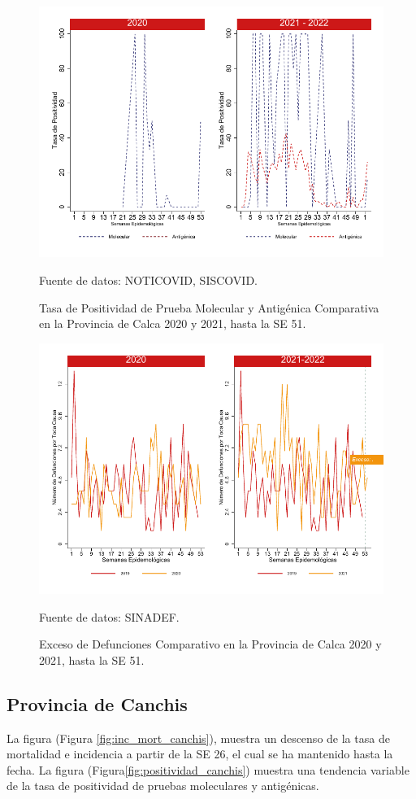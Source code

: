 \documentclass[12pt,a4paper,openany]{book}
\begin{document}
		\begin{figure}[h]
			\caption{Tasa de Positividad de Prueba Molecular y Antigénica Comparativa en la Provincia de Calca 2020 y 2021, hasta la SE 51.}\label{fig:positividad_calca}
			\begin{center}
				\includegraphics[width=0.7\linewidth]{../figuras/positividad_20_21_4}
			\end{center}
			{\footnotesize {Fuente de datos: NOTICOVID, SISCOVID.}}
		\end{figure}
		
		\begin{figure}[h]
			\caption{Exceso de Defunciones Comparativo en la Provincia de Calca 2020 y 2021, hasta la SE 51.}\label{fig:exceso_calca}
			\begin{center}
				\includegraphics[width=0.7\linewidth]{../figuras/exceso_4}
			\end{center}
			{\footnotesize {Fuente de datos: SINADEF.}}
		\end{figure}
		
		\clearpage
		
		\subsection*{Provincia de Canchis}
		\noindent La figura (Figura \ref{fig:inc_mort_canchis}),  muestra un descenso de la tasa de mortalidad e incidencia a partir de la SE 26, el cual se ha mantenido hasta la fecha. 
		\noindent La figura (Figura\ref{fig:positividad_canchis}) muestra una tendencia variable de la tasa de positividad de pruebas moleculares y antigénicas.
		
\end{document}
